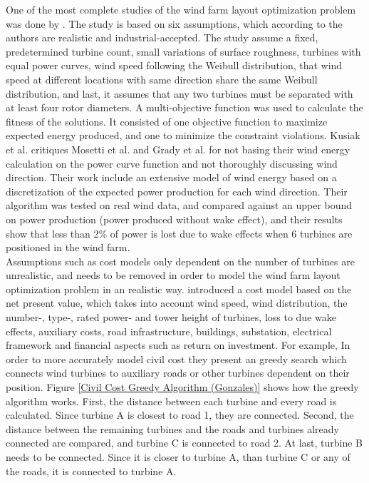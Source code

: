\noindent One of the most complete studies of the wind farm layout optimization problem was done by \cite{Kusiak}. The study is based on six assumptions, which according to the authors are realistic and industrial-accepted. The study assume a fixed, predetermined turbine count, small variations of surface roughness, turbines with equal power curves, wind speed following the Weibull distribution, that wind speed at different locations with same direction share the same Weibull distribution, and last, it assumes that any two turbines must be separated with at least four rotor diameters. A multi-objective function was used to calculate the fitness of the solutions. It consisted of one objective function to maximize expected energy produced, and one to minimize the constraint violations. Kusiak et al. critiques Mosetti et al. and Grady et al. for not basing their wind energy calculation on the power curve function and not thoroughly discussing wind direction. Their work include an extensive model of wind energy based on a discretization of the expected power production for each wind direction. Their algorithm was tested on real wind data, and compared against an upper bound on power production (power produced without wake effect), and their results show that less than 2\% of power is lost due to wake effects when 6 turbines are positioned in the wind farm. \\


\noindent Assumptions such as cost models only dependent on the number of turbines are unrealistic, and needs to be removed in order to model the wind farm layout optimization problem in an realistic way.  \cite{Gonzalez} introduced a cost model based on the net present value, which takes into account wind speed, wind distribution, the number-, type-, rated power- and tower height of turbines, loss to due wake effects, auxiliary costs, road infrastructure, buildings, substation, electrical framework and financial aspects such as return on investment. For example, In order to more accurately model civil cost they present an greedy search which connects wind turbines to auxiliary roads or other turbines dependent on their position. Figure \ref{Civil Cost Greedy Algorithm (Gonzales)} shows how the greedy algorithm works. First, the distance between each turbine and every road is calculated. Since turbine A is closest to road 1, they are connected. Second, the distance between the remaining turbines and the roads and turbines already connected are compared, and turbine C is connected to road 2. At last, turbine B needs to be connected. Since it is closer to turbine A, than turbine C or any of the roads, it is connected to turbine A.\\


